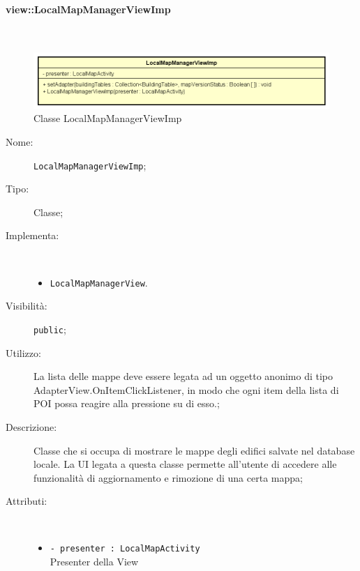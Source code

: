 \documentclass[../DefinizioneDiProdotto.tex]{subfiles}
\begin{document}
\paragraph{view::LocalMapManagerViewImp}
\
\begin{figure}[H]
	\centering
	\includegraphics[width=\maxwidth]{img/LocalMapManagerViewImp.png}
	\caption{Classe LocalMapManagerViewImp}\label{fig:view::LocalMapManagerViewImp} 
\end{figure}
\begin{description}
	\item[Nome:] \texttt{LocalMapManagerViewImp};
	\item[Tipo:] Classe;
	\item[Implementa:] \
	\begin{itemize}
		\item \texttt{LocalMapManagerView}.
		
	\end{itemize}
	\item[Visibilità:] \texttt{public};
	\item[Utilizzo:] La lista delle mappe deve essere legata ad un oggetto anonimo di tipo AdapterView.OnItemClickListener, in modo che ogni item della lista di POI possa reagire alla pressione su di esso.;
	\item[Descrizione:] Classe che si occupa di mostrare le mappe degli edifici salvate nel database locale. La UI legata a questa classe permette all'utente di accedere alle funzionalità di aggiornamento e rimozione di una certa mappa;
	\item[Attributi:] \
	\begin{itemize}
		\item \texttt{- presenter : LocalMapActivity}\\
		Presenter della View
		

\end{itemize}
\end{description}
\end{document}
